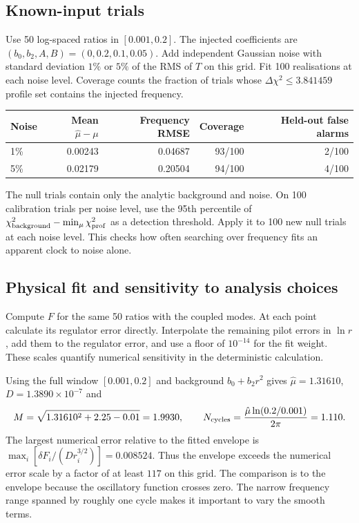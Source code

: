 \subsection{Known-input trials}
Use 50 log-spaced ratios in $[0.001,0.2]$. The injected coefficients are $(b_0,b_2,A,B)=(0,0.2,0.1,0.05)$. Add independent Gaussian noise with standard deviation $1\%$ or $5\%$ of the RMS of $T$ on this grid. Fit 100 realisations at each noise level. Coverage counts the fraction of trials whose $\Delta\chi^2\le3.841459$ profile set contains the injected frequency.
\begin{center}\begin{tabular}{lrrrr}\toprule Noise & Mean $\hat\mu-\mu$ & Frequency RMSE & Coverage & Held-out false alarms\\\midrule
1\% & 0.00243 & 0.04687 & 93/100 & 2/100\\
5\% & 0.02179 & 0.20504 & 94/100 & 4/100\\\bottomrule\end{tabular}\end{center}
\clearpage
The null trials contain only the analytic background and noise. On 100 calibration trials per noise level, use the 95th percentile of $\chi^2_{\rm background}-\min_\mu\chi^2_{\rm prof}$ as a detection threshold. Apply it to 100 new null trials at each noise level. This checks how often searching over frequency fits an apparent clock to noise alone.
\subsection{Physical fit and sensitivity to analysis choices}
Compute $F$ for the same 50 ratios with the coupled modes. At each point calculate its regulator error directly. Interpolate the remaining pilot errors in $\ln r$, add them to the regulator error, and use a floor of $10^{-14}$ for the fit weight. These scales quantify numerical sensitivity in the deterministic calculation.

Using the full window $[0.001,0.2]$ and background $b_0+b_2r^2$ gives $\hat\mu=1.31610$, $D=1.3890\times10^{-7}$ and
\[
 M=\sqrt{1.31610^2+2.25-0.01}=1.9930,\qquad
 N_{\rm cycles}=\frac{\hat\mu\ln(0.2/0.001)}{2\pi}=1.110 .
\]
The largest numerical error relative to the fitted envelope is
$\max_i[\delta F_i/(D r_i^{3/2})]=0.008524$. Thus the envelope exceeds the numerical error scale by a factor of at least $117$ on this grid. The comparison is to the envelope because the oscillatory function crosses zero. The narrow frequency range spanned by roughly one cycle makes it important to vary the smooth terms.
\clearpage
